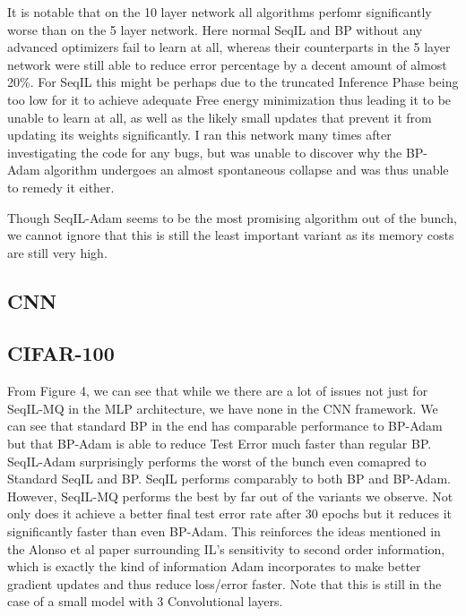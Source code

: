 \documentclass{article}
\theoremstyle{plain}
\theoremstyle{definition}
\theoremstyle{remark}
\begin{document}
It is notable that on the 10 layer network all algorithms perfomr significantly worse than on the 5 layer 
network. Here normal SeqIL and BP without any advanced optimizers fail to learn at all,
whereas their counterparts in the 5 layer network were still able to reduce error percentage by a decent amount of 
almost 20\%. For SeqIL this might be perhaps due to the truncated Inference Phase being too low for it to achieve 
adequate Free energy minimization thus leading it to be unable to learn at all, as well as the likely small updates that 
prevent it from updating its weights significantly. I ran this network many times after investigating the code for any bugs,
but was unable to discover why the BP-Adam algorithm undergoes an almost spontaneous collapse and was thus 
unable to remedy it either. 

Though SeqIL-Adam seems to be the most promising algorithm out of the bunch, we cannot ignore 
that this is still the least important variant as its memory costs are still very high. 

\subsection*{CNN}

\subsection*{CIFAR-100}

From Figure 4, we can see that while we there are a lot of issues not just for 
SeqIL-MQ in the MLP architecture, we have none in the CNN framework. We can see that standard 
BP in the end has comparable performance to BP-Adam but that BP-Adam is able to reduce 
Test Error much faster than regular BP. SeqIL-Adam surprisingly performs the worst of the bunch 
even comapred to Standard SeqIL and BP. SeqIL performs comparably to both BP and BP-Adam.
However, SeqIL-MQ performs the best by far out of the variants we observe. Not only does it achieve a better final 
test error rate after 30 epochs but it reduces it significantly faster than even BP-Adam.
This reinforces the ideas mentioned in the Alonso et al paper surrounding IL's sensitivity to second 
order information, which is exactly the kind of information Adam incorporates to make better gradient updates and thus 
reduce loss/error faster. Note that this is still in the case of a small model with 3 Convolutional layers.
\end{document}
